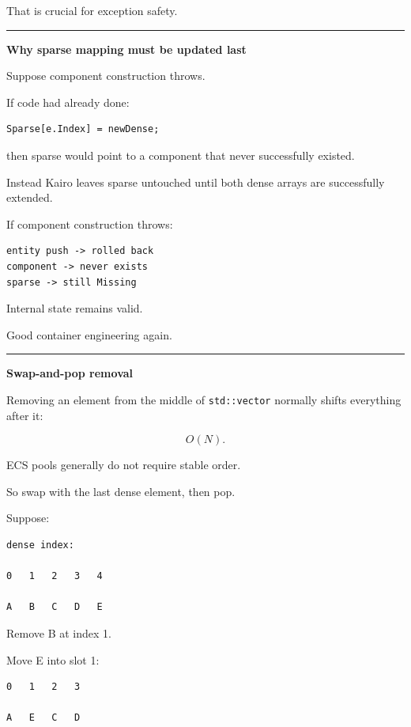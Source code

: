 That is crucial for exception safety.

\begin{center}\rule{0.5\linewidth}{0.5pt}\end{center}

\textbf{Why sparse mapping must be updated last}

Suppose component construction throws.

If code had already done:

\begin{verbatim}
Sparse[e.Index] = newDense;
\end{verbatim}

then sparse would point to a component that never successfully existed.

Instead Kairo leaves sparse untouched until both dense arrays are successfully extended.

If component construction throws:

\begin{verbatim}
entity push -> rolled back
component -> never exists
sparse -> still Missing
\end{verbatim}

Internal state remains valid.

Good container engineering again.

\begin{center}\rule{0.5\linewidth}{0.5pt}\end{center}

\textbf{Swap-and-pop removal}

Removing an element from the middle of \texttt{std::vector} normally shifts everything after it:

\[
O(N).
\]

ECS pools generally do not require stable order.

So swap with the last dense element, then pop.

Suppose:

\begin{verbatim}
dense index:

0   1   2   3   4

A   B   C   D   E
\end{verbatim}

Remove B at index 1.

Move E into slot 1:

\begin{verbatim}
0   1   2   3

A   E   C   D
\end{verbatim}

